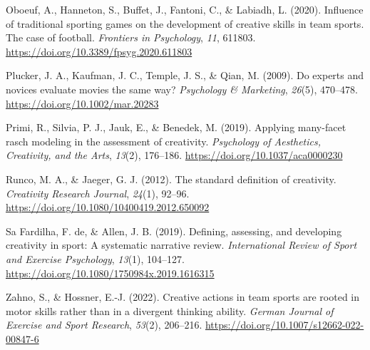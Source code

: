 \documentclass[
  12pt,
]{article}
\newlength{\cslhangindent}
\newenvironment{CSLReferences}[2] %
 {\begin{list}{}{%
  \setlength{\itemindent}{0pt}
  \setlength{\leftmargin}{0pt}
  \setlength{\parsep}{0pt}
  \ifodd #1
   \setlength{\leftmargin}{\cslhangindent}
   \setlength{\itemindent}{-1\cslhangindent}
  \fi
  \setlength{\itemsep}{#2\baselineskip}}}
 {\end{list}}
\begin{document}
\begin{CSLReferences}{1}{0}
Oboeuf, A., Hanneton, S., Buffet, J., Fantoni, C., \& Labiadh, L.
(2020). Influence of traditional sporting games on the development of
creative skills in team sports. The case of football. \emph{Frontiers in
Psychology}, \emph{11}, 611803.
\url{https://doi.org/10.3389/fpsyg.2020.611803}

Plucker, J. A., Kaufman, J. C., Temple, J. S., \& Qian, M. (2009). Do
experts and novices evaluate movies the same way? \emph{Psychology \&
Marketing}, \emph{26}(5), 470--478.
\url{https://doi.org/10.1002/mar.20283}

Primi, R., Silvia, P. J., Jauk, E., \& Benedek, M. (2019). Applying
many-facet rasch modeling in the assessment of creativity.
\emph{Psychology of Aesthetics, Creativity, and the Arts}, \emph{13}(2),
176--186. \url{https://doi.org/10.1037/aca0000230}

Runco, M. A., \& Jaeger, G. J. (2012). The standard definition of
creativity. \emph{Creativity Research Journal}, \emph{24}(1), 92--96.
\url{https://doi.org/10.1080/10400419.2012.650092}

Sa Fardilha, F. de, \& Allen, J. B. (2019). Defining, assessing, and
developing creativity in sport: A systematic narrative review.
\emph{International Review of Sport and Exercise Psychology},
\emph{13}(1), 104--127.
\url{https://doi.org/10.1080/1750984x.2019.1616315}

Zahno, S., \& Hossner, E.-J. (2022). Creative actions in team sports are
rooted in motor skills rather than in a divergent thinking ability.
\emph{German Journal of Exercise and Sport Research}, \emph{53}(2),
206--216. \url{https://doi.org/10.1007/s12662-022-00847-6}

\end{CSLReferences}
\end{document}
